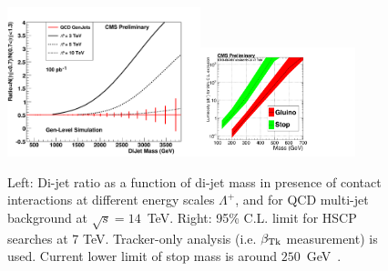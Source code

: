 \documentclass{PoS}
\begin{document}
\begin{figure}[htbp] 
\centering
\includegraphics[width=0.5\textwidth]{100pbOptFix.pdf}\includegraphics[width=0.4\textwidth]{HSCP1.pdf}  
\caption{Left: Di-jet ratio as a function of di-jet mass in presence of 
contact interactions at different energy scales $\Lambda^{+}$, 
and for QCD multi-jet background at $\sqrt{s} = 14$~TeV.  
Right: 95\% C.L. limit for HSCP searches at 7 TeV. Tracker-only analysis (i.e. $\beta_{{\rm Tk}}$ measurement) is used. 
Current lower limit of stop mass is around $250$~GeV~\cite{Abazov:2008quETAaltonen:2009kea}.}
\label{fig:DiJetRatioAndHSCP}
\end{figure}
\end{document}
